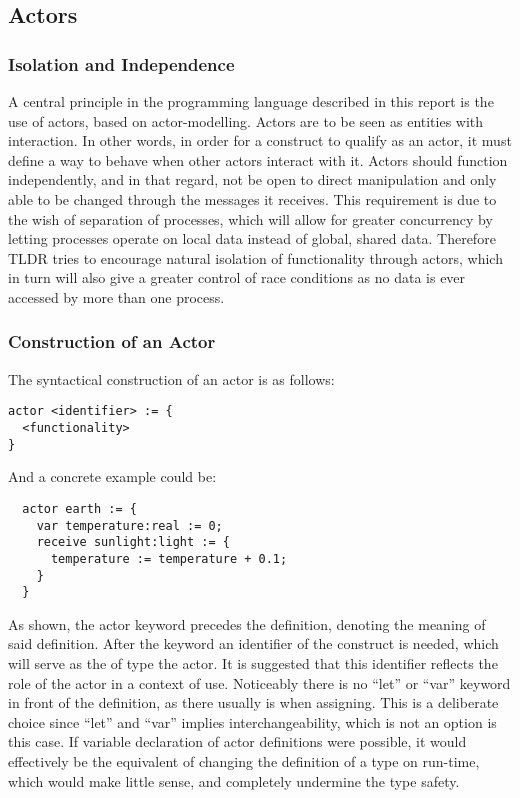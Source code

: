\subsection{Actors}


\subsubsection{Isolation and Independence}

A central principle in the programming language described in this report is the use of actors, based on actor-modelling. Actors are to be seen as entities with interaction. In other words, in order for a construct to qualify as an actor, it must define a way to behave when other actors interact with it. Actors should function independently, and in that regard, not be open to direct manipulation and only able to be changed through the messages it receives. This requirement is due to the wish of separation of processes, which will allow for greater concurrency by letting processes operate on local data instead of global, shared data. Therefore TLDR tries to encourage natural isolation of functionality through actors, which in turn will also give a greater control of race conditions as no data is ever accessed by more than one process.

\subsubsection{Construction of an Actor}
\label{sub:constructionOfAnActor}

The syntactical construction of an actor is as follows:

\begin{lstlisting}
actor <identifier> := {
  <functionality>
}
\end{lstlisting}

And a concrete example could be:

\begin{verbatim}
  actor earth := {
    var temperature:real := 0;
    receive sunlight:light := {
      temperature := temperature + 0.1;
    }
  }
\end{verbatim}

As shown, the actor keyword precedes the definition, denoting the meaning of said definition. After the keyword an identifier of the construct is needed, which will serve as the of type the actor. It is suggested that this identifier reflects the role of the actor in a context of use. Noticeably there is no \enquote{let} or \enquote{var} keyword in front of the definition, as there usually is when assigning. This is a deliberate choice since \enquote{let} and \enquote{var} implies interchangeability, which is not an option is this case. If variable declaration of actor definitions were possible, it would effectively be the equivalent of changing the definition of a type on run-time, which would make little sense, and completely undermine the type safety.

